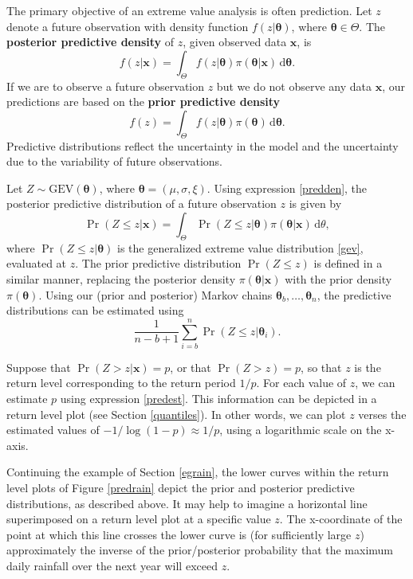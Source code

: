 \documentclass[11pt,a4paper]{article}
\newcommand{\bs}{\boldsymbol}
\begin{document}
The primary objective of an extreme value analysis is often
prediction.  Let $z$ denote a future observation with density function
$f(z|\bs{\theta})$, where $\bs{\theta} \in \Theta$.  The
\textbf{posterior predictive density} of $z$, given observed data
$\bs{x}$, is
\begin{equation}
  f(z|\bs{x}) = \int_\Theta f(z|\bs{\theta})\pi(\bs{\theta}|\bs{x}) \,
  \text{d}\bs{\theta}. 
\label{predden}
\end{equation}
If we are to observe a future observation $z$ but we do not observe
any data $\bs{x}$, our predictions are based on the \textbf{prior
  predictive density}
\begin{equation*}
  f(z) = \int_\Theta f(z|\bs{\theta})\pi(\bs{\theta}) \,
  \text{d}\bs{\theta}. 
\end{equation*}
Predictive distributions reflect the uncertainty in the model and the
uncertainty due to the variability of future observations.

Let $Z \sim \text{GEV}(\bs{\theta})$, where $\bs{\theta} =
(\mu,\sigma,\xi)$.  Using expression \eqref{predden}, the posterior
predictive distribution of a future observation $z$ is given by
\begin{equation*}
  \Pr(Z \leq z | \bs{x}) = \int_\Theta \Pr(Z \leq z |
  \bs{\theta})\pi(\bs{\theta}|\bs{x}) \, \text{d}\theta, 
\end{equation*}
where $\Pr(Z \leq z | \bs{\theta})$ is the generalized extreme value
distribution \eqref{gev}, evaluated at $z$.  The prior predictive
distribution $\Pr(Z \leq z)$ is defined in a similar manner, replacing
the posterior density $\pi(\bs{\theta}|\bs{x})$ with the prior density
$\pi(\bs{\theta})$.  Using our (prior and posterior) Markov chains
$\bs{\theta}_b,\dots,\bs{\theta}_n$, the predictive distributions can
be estimated using
\begin{equation}
\frac{1}{n-b+1} \sum_{i=b}^{n} \Pr(Z \leq z | \bs{\theta}_i).
\label{predest}
\end{equation}

Suppose that $\Pr(Z > z | \bs{x}) = p$, or that $\Pr(Z > z) = p$, so
that $z$ is the return level corresponding to the return period $1/p$.
For each value of $z$, we can estimate $p$ using expression
\eqref{predest}.  This information can be depicted in a return level
plot (see Section \ref{quantiles}).  In other words, we can plot $z$
verses the estimated values of $-1/\log(1-p) \approx 1/p$, using a
logarithmic scale on the x-axis.

Continuing the example of Section \ref{egrain}, the lower curves
within the return level plots of Figure \ref{predrain} depict the
prior and posterior predictive distributions, as described above.  It
may help to imagine a horizontal line superimposed on a return level
plot at a specific value $z$.  The x-coordinate of the point at which
this line crosses the lower curve is (for sufficiently large $z$)
approximately the inverse of the prior/posterior probability that the
maximum daily rainfall over the next year will exceed $z$.
\end{document}
